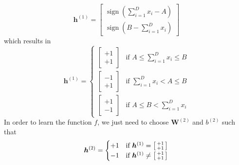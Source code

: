 \documentclass[11pt]{article}
\DeclareMathOperator{\sign}{sign}
\begin{document}
\begin{equation*}
  \bm{h}^{(1)} = \begin{bmatrix}
                   \sign \left( \sum_{i = 1}^{D} x_{i} - A \right) \\
                   \sign \left( B - \sum_{i = 1}^{D} x_{i}  \right)
                 \end{bmatrix}
               \end{equation*}
               which results in
\begin{equation*}
  \bm{h}^{(1)} = \begin{cases}
                   \begin{bmatrix}
                     +1 \\
                     +1
                   \end{bmatrix} &\text{if } A \leq \sum_{i = 1}^{D} x_{i} \leq B \\
                                  \begin{bmatrix}
                     -1 \\
                     +1
                                  \end{bmatrix} &\text{if } \sum_{i = 1}^{D} x_{i} < A \leq B \\
                                                                 \begin{bmatrix}
                     +1 \\
                     -1
                   \end{bmatrix} &\text{if } A \leq B < \sum_{i = 1}^{D} x_{i}
                 \end{cases}
\end{equation*}
In order to learn the function $f$, we just need to choose $\bm{W}^{(2)}$ and $b^{(2)}$ such that
\begin{align*}
  \bm{h}^{(2)} &= \begin{cases}
                   +1 &\text{if } \bm{h}^{(1)} =  \begin{bsmallmatrix}
                     +1 \\
                     +1
                                                  \end{bsmallmatrix} \\
                   -1 &\text{if } \bm{h}^{(1)} \neq  \begin{bsmallmatrix}
                                                       +1 \\
                                                       +1
                                                     \end{bsmallmatrix} \\
                  \end{cases} \\
\end{align*}
\end{document}

